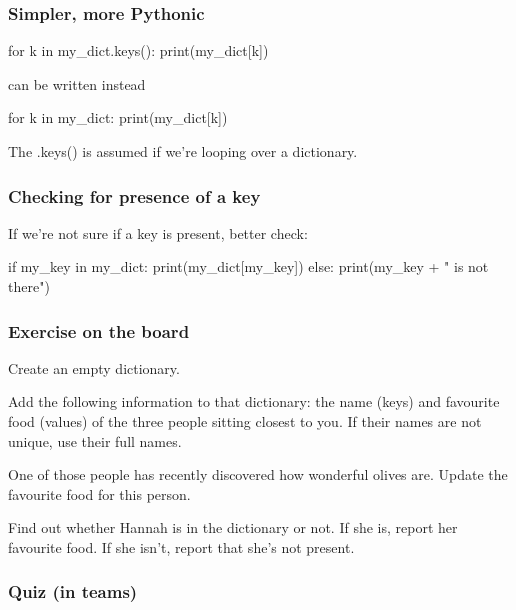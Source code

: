 \documentclass{beamer}
\begin{document}
\begin{frame}[fragile]
\frametitle{Simpler, more Pythonic}
\begin{code}
for k in my_dict.keys():
   print(my_dict[k])
\end{code}
can be written instead
\begin{code}
for k in my_dict:
   print(my_dict[k])
\end{code}
The .keys() is assumed if we're looping over a dictionary.
\end{frame}


\begin{frame}[fragile]
\frametitle{Checking for presence of a key}

If we're not sure if a key is present, better check:
\begin{code}
if my_key in my_dict:
   print(my_dict[my_key])
else:
   print(my_key + " is not there")
\end{code}
\end{frame}

\begin{frame}
\frametitle{Exercise on the board}
Create an empty dictionary.

\bigskip

Add the following information to that dictionary: the
name (keys) and favourite food (values) of the three
people sitting closest to you. If their names are not
unique, use their full names.

\bigskip

One of those people has recently discovered how wonderful olives
are. Update the favourite food for this person.

\bigskip

Find out whether Hannah is in the dictionary or not. If she is, report
her favourite food. If she isn't, report that she's not present.
\end{frame}



\begin{frame}[fragile]
\frametitle{Quiz (in teams)}
\end{frame}
\end{document}
